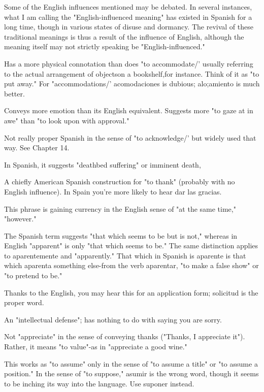 Some of the English influences mentioned may be debated. In
several instances, what I am calling the "English-influenced meaning"
has existed in Spanish for a long time, though in various states of disuse and dormancy. The revival of these traditional meanings is thus a
result of the influence of English, although the meaning itself may not
strictly speaking be "English-influenced."

\bsk

 Has a more physical connotation than does "to
accommodate/' usually referring to the actual arrangement of objectson a bookshelf,for instance. Think of it as "to put away." For "accommodations/' acomodaciones is dubious; alo;amiento is much better.

 Conveys more emotion than its English equivalent.
Suggests more "to gaze at in awe" than "to look upon with approval."

 Not really proper Spanish in the sense of "to acknowledge/' but widely used that way. See Chapter 14.

 In Spanish, it suggests "deathbed suffering" or imminent death,

 A chiefly American Spanish construction for
"to thank" (probably with no English influence). In Spain you're more
likely to hear dar las gracias.

 This phrase is gaining currency in the English sense of "at the same time," "however."

 The Spanish term suggests "that which seems
to be but is not," whereas in English "apparent" is only "that which
seems to be." The same distinction applies to aparentemente and "apparently." That which in Spanish is aparente is that which aparenta
something else-from the verb aparentar, "to make a false show" or
"to pretend to be."

 Thanks to the English, you may hear this for an
application form; solicitud is the proper word.

 An "intellectual defense"; has nothing to do with
saying you are sorry.

 Not "appreciate" in the sense of conveying
thanks ("Thanks, I appreciate it"). Rather, it means "to value"-as
in "appreciate a good wine."

 This works as "to assume" only in the sense of "to
assume a title" or "to assume a position." In the sense of "to suppose,"
asumir is the wrong word, though it seems to be inching its way into
the language. Use suponer instead.

